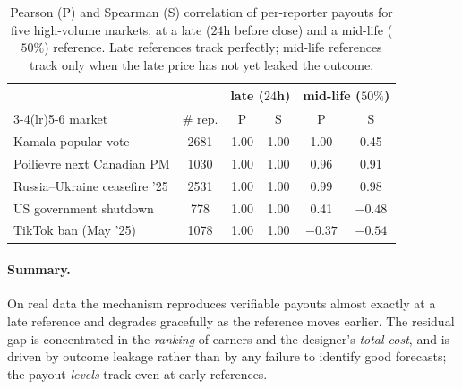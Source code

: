 \begin{table}[ht]
    \centering
    \caption[Per-market agreement]{Pearson (P) and Spearman (S) correlation of per-reporter
    payouts for five high-volume markets, at a late ($24$h before close) and a mid-life
    ($50\%$) reference. Late references track perfectly; mid-life references track only when
    the late price has not yet leaked the outcome.}
    \label{tab:permarket}
    \begin{tabular}{lccccc}
        \toprule
        & & \multicolumn{2}{c}{late ($24$h)} & \multicolumn{2}{c}{mid-life ($50\%$)} \\
        \cmidrule(lr){3-4}\cmidrule(lr){5-6}
        market & \# rep. & P & S & P & S \\
        \midrule
        Kamala popular vote          & 2681 & 1.00 & 1.00 & 1.00 & 0.45 \\
        Poilievre next Canadian PM   & 1030 & 1.00 & 1.00 & 0.96 & 0.91 \\
        Russia--Ukraine ceasefire '25 & 2531 & 1.00 & 1.00 & 0.99 & 0.98 \\
        US government shutdown       &  778 & 1.00 & 1.00 & 0.41 & $-0.48$ \\
        TikTok ban (May '25)         & 1078 & 1.00 & 1.00 & $-0.37$ & $-0.54$ \\
        \bottomrule
    \end{tabular}
\end{table}

\paragraph{Summary.}
On real data the mechanism reproduces verifiable payouts almost exactly at a late reference
and degrades gracefully as the reference moves earlier. The residual gap is concentrated in
the \emph{ranking} of earners and the designer's \emph{total cost}, and is driven by outcome
leakage rather than by any failure to identify good forecasts; the payout \emph{levels}
track even at early references.
